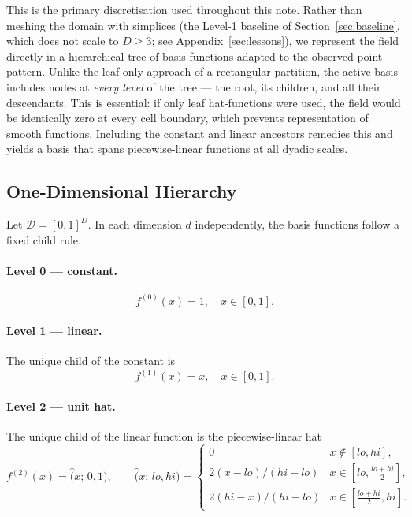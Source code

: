 \documentclass[11pt]{article}
\begin{document}
This is the primary discretisation used throughout this note.  Rather than
meshing the domain with simplices (the Level-1 baseline of
Section~\ref{sec:baseline}, which does not scale to $D\ge 3$; see
Appendix~\ref{sec:lessons}), we represent the field directly in a
hierarchical tree of basis functions adapted to the observed point pattern.
Unlike the leaf-only approach of a rectangular partition, the active basis
includes nodes at \emph{every level} of the tree — the root, its children, and
all their descendants.  This is essential: if only leaf hat-functions were used,
the field would be identically zero at every cell boundary, which prevents
representation of smooth functions.  Including the constant and linear ancestors
remedies this and yields a basis that spans piecewise-linear functions at all
dyadic scales.

\subsection{One-Dimensional Hierarchy}
\label{sec:1d-hierarchy}

Let $\mathcal{D} = [0,1]^D$.  In each dimension $d$ independently, the
basis functions follow a fixed child rule.

\paragraph{Level 0 --- constant.}
\begin{equation}
  f^{(0)}(x) = 1, \quad x \in [0,1].
  \label{eq:f0}
\end{equation}

\paragraph{Level 1 --- linear.}
The unique child of the constant is
\begin{equation}
  f^{(1)}(x) = x, \quad x \in [0,1].
  \label{eq:f1}
\end{equation}

\paragraph{Level 2 --- unit hat.}
The unique child of the linear function is the piecewise-linear hat
\begin{equation}
  f^{(2)}(x) = \hat(x;\,0,1), \qquad
  \hat(x;\,lo,hi) =
  \begin{cases}
    0                  & x \notin [lo,hi], \\
    2(x-lo)/(hi-lo)   & x \in [lo,\tfrac{lo+hi}{2}], \\
    2(hi-x)/(hi-lo)   & x \in [\tfrac{lo+hi}{2},hi].
  \end{cases}
  \label{eq:hat1d}
\end{equation}
\end{document}
